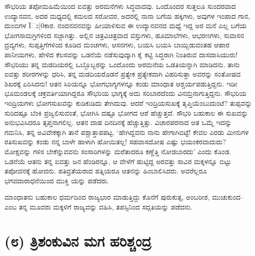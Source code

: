 ಸೌಭರಿಯ ತಪೋಮಹಿಮೆಯಿಂದ ಐವತ್ತು ಅರಮನೆಗಳು ಸಿದ್ಧವಾದವು. ಒಂದೊಂದರ ಸುತ್ತಲೂ ಸುಂದರವಾದ ಉದ್ಯಾನವನ, ಅದರ ಮಧ್ಯದಲ್ಲಿ ಕಮಲದ ಸರೋವರ, ಅದರಲ್ಲಿ ನಾನಾ ಬಗೆಯ ಹಕ್ಕಿಗಳು, ಅವುಗಳ ಇಂಪಾದ ಗಾನ, ದುಂಬಿಗಳ Ïು|0ಕಾರ. ನಂದನವನವನ್ನು ಹೀಯಾಳಿಸುವ ಈ ಉದ್ಯಾನವನದ ಮಧ್ಯೆ ಇದ್ದ ಅರ ಮನೆ ಎಲ್ಲ ಬಗೆಯ ಭೋಗಸಾಮಗ್ರಿಗಳಿಂದ ಸಜ್ಜಾಗಿತ್ತು. ಅಲ್ಲಿನ ಚಿತ್ರವಿಚಿತ್ರವಾದ ವಸ್ತುಗಳು, ಹೂಮಾಲೆಗಳು, ಆಭರಣಗಳು, ಸುವಾಸನ ದ್ರವ್ಯಗಳು, ಸುಪ್ಪತ್ತಿಗೆಗಳಿಂದ ಕೂಡಿದ ಮಂಚಗಳು, ಆಸನಗಳು, ಬಯಸಿ ಬಯಸಿ ಬಾಯ್ಬಿಡುವಂತಹ ಆಹಾರ ಪಾನೀಯಗಳು, ಹೇಳಿದ ಕೆಲಸವನ್ನು ಒಡನೆಯೆ ನಡೆಸುವುದ್ಕಾಗಿ ಕೈ ಕಟ್ಟಿ ಸಿದ್ಧರಾಗಿ ನಿಂತಿರುವ ದಾಸದಾಸಿಯುರು! ಸೌಭರಿಯು ತನ್ನ ಮಡದಿಯರಲ್ಲಿ ಒಬ್ಬೊಬ್ಬರನ್ನು ಒಂದೊಂದು ಅರಮನೆಯ ಒಡತಿಯನ್ನಾಗಿ ಮಾಡಿದನು. ತಾನು ಐವತ್ತು ಶರೀರಗಳನ್ನು ಧರಿಸಿ, ತನ್ನ ಮಡದಿಯರೊಡನೆ ಪ್ರತ್ಯೇಕ ಪ್ರತ್ಯೇಕವಾಗಿ ವಿಹರಿಸುತ್ತಾ ಅವರನ್ನು ಸಂತೋಷದ ಶಿಖರಕ್ಕೆ ಏರಿಸಿದನು! ಆತನ ಸಿರಿಯನ್ನೂ ಭೋಗಭಾಗ್ಯಗಳನ್ನೂ ಕಂಡು ಮಾಂಧಾತ ಆಶ್ಚರ್ಯಪಡುತ್ತಿದ್ದನು. ಇಡೀ ಭೂಮಂಡಲಕ್ಕೆ ಚಕ್ರವರ್ತಿಯಾಗಿದ್ದರೂ ಸೌಭರಿಯ ಭಾಗ್ಯಕ್ಕೆ ಅದು ಸರಿಬಾರದೆಂದು ವಿನಮ್ರನಾಗುತ್ತಿದ್ದನು. ಸೌಭರಿಯ ಇಂದ್ರಿಯಗಳು ಭೋಗಸುಖವನ್ನು ಕುಡಿಕುಡಿದು ತೇಗಿದುವು. ಆದರೆ ಇಂದ್ರಿಯಸುಖಕ್ಕೆ ತೃಪ್ತಿಯೆಂಬುದುಂಟೆ? ತುಪ್ಪವನ್ನು ಸುರಿದಷ್ಟೂ ಬೆಂಕಿ ಪ್ರಜ್ವಲಿಸುವಂತೆ, ಭೋಗಿಸಿ ದಷ್ಟೂ ಭೋಗದ ಆಶೆ ಹೆಚ್ಚುತ್ತದೆ. ಸೌಭರಿ ಬಹುಕಾಲ ಈ ಸುಖವನ್ನು ಅನುಭವಿಸಿದರೂ ತೃಪ್ತನಾಗಲಿಲ್ಲ. ಆತನ ದಾಹ ದಿನದಿನಕ್ಕೆ ಹೆಚ್ಚುತ್ತಿತ್ತು. ವಿಚಾರಪರನಾದ ಆತ ಒಮ್ಮೆ ಇದನ್ನು ಗಮನಿಸಿ, ತನ್ನ ಅವಿವೇಕಕ್ಕಾಗಿ ತಾನೆ ಪಶ್ಚಾತ್ತಾಪಪಟ್ಟ. ‘ಹೇಗಿದ್ದವನು ನಾನು ಹೇಗಾಗಿಬಿಟ್ಟೆ! ಕೇವಲ ಎರಡು ಮೀನುಗಳ ರತಿಸುಖವನ್ನು ಕಂಡು ನನ್ನ ಬಾಳೇ ಹಾಳಾಗಿ ಹೋಯಿತಲ್ಲ! ಸಹವಾಸದೋಷ ಎಷ್ಟು ಭಯಂಕರವಾದುದು? ಮೋಕ್ಷವನ್ನು ಗಳಿಸ ಬೇಕೆನ್ನುವವನು ಸಂಸಾರಿಗಳನ್ನು ಮರೆತಾದರೂ ಕಣ್ಣೆತ್ತಿ ನೋಡಬಾರದು’ ಎಂದು ಕೊಂಡ. ಒಡನೆಯೆ ಆತನು ತನ್ನ ಐವತ್ತು ಜನ ಹೆಂಡಿರನ್ನೂ, ಆ ವೇಳೆಗೆ ಹುಟ್ಟಿದ್ದ ಅರವತ್ತು ಸಾವಿರ ಮಕ್ಕಳನ್ನೂ ಬಿಟ್ಟು ತಪೋವನಕ್ಕೆ ಹೋದನು. ಪತಿವ್ರತೆಯರಾದ ಪತ್ನಿಯರೂ ಆತನನ್ನು ಹಿಂಬಾಲಿಸಿದರು. ಅವರೆಲ್ಲರೂ ಭಗವದಾರಾಧನೆಯಿಂದ ಮುಕ್ತಿ ಯನ್ನು ಪಡೆದರು.

ಮಾಂಧಾತನು ಬಹುಕಾಲ ಧರ್ಮದಿಂದ ರಾಜ್ಯಭಾರ ಮಾಡುತ್ತಿದ್ದು ಕೊನೆಗೆ ಪುರುಕುತ್ಸ, ಅಂಬರೀಶ, ಮುಚುಕುಂದ–ಎಂಬ ತನ್ನ ಮೂವರು ಮಕ್ಕಳಿಗೆ ರಾಜ್ಯವನ್ನು ವಹಿಸಿ, ತಪಸ್ಸಿನಿಂದ ಸದ್ಗತಿಯನ್ನು ಪಡೆದನು.


\section{(೮) ತ್ರಿಶಂಕುವಿನ ಮಗ ಹರಿಶ್ಚಂದ್ರ}


